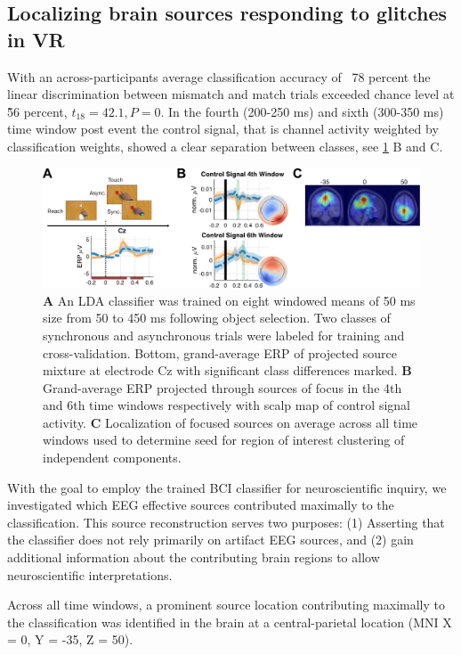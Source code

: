 \subsection{Localizing brain sources responding to glitches in VR}
With an across-participants average classification accuracy of ~78 percent the linear discrimination between mismatch and match trials exceeded chance level at \~56 percent, $t_{18} = 42.1, P = 0$. In the fourth (200-250 ms) and sixth (300-350 ms) time window post event the control signal, that is channel activity weighted by classification weights, showed a clear separation between classes, see \ref{lda} B and C.


\begin{figure}[h]
  \includegraphics[width=\textwidth]{figures/fig2_discrimination_short.pdf}
  \caption{\textbf{A} An LDA classifier was trained on eight windowed means of 50 ms size from 50 to 450 ms following object selection. Two classes of synchronous and asynchronous trials were labeled for training and cross-validation. Bottom, grand-average ERP of projected source mixture at electrode Cz with significant class differences marked. \textbf{B} Grand-average ERP projected through sources of focus in the 4th and 6th time windows respectively with scalp map of control signal activity. \textbf{C} Localization of focused sources on average across all time windows used to determine seed for region of interest clustering of independent components.}
  \label{lda}
\end{figure}
With the goal to employ the trained BCI classifier for neuroscientific inquiry, we investigated which EEG effective sources contributed maximally to the classification. This source reconstruction serves two purposes: (1) Asserting that the classifier does not rely primarily on artifact EEG sources, and (2) gain additional information about the contributing brain regions to allow neuroscientific interpretations.


Across all time windows, a prominent source location contributing maximally to the classification was identified in the brain at a central-parietal location (MNI X = 0, Y = -35, Z = 50).